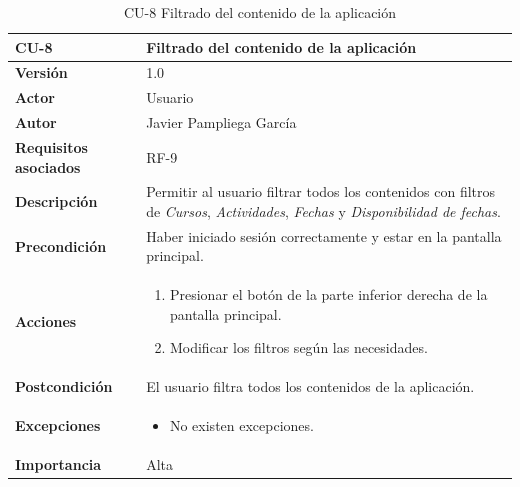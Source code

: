 \begin{table}[p]
	\centering
	\begin{tabularx}{\linewidth}{ p{} p{} }
		\toprule
		\textbf{CU-8}    & \textbf{Filtrado del contenido de la aplicación}\\
		\toprule
		\textbf{Versión}              & 1.0    \\
            \textbf{Actor}                & Usuario \\
		\textbf{Autor}                & Javier Pampliega García \\
		\textbf{Requisitos asociados} & RF-9\\
		\textbf{Descripción}          & Permitir al usuario filtrar todos los contenidos con filtros de \textit{Cursos}, \textit{Actividades}, \textit{Fechas} y \textit{Disponibilidad de fechas}. \\
		\textbf{Precondición}         & Haber iniciado sesión correctamente y estar en la pantalla principal. \\
		\textbf{Acciones}             &
		\begin{enumerate}
			\def\labelenumi{\arabic{enumi}.}
			\tightlist
			\item Presionar el botón de la parte inferior derecha de la pantalla principal.
                \item Modificar los filtros según las necesidades.
		\end{enumerate}\\
		\textbf{Postcondición}        & El usuario filtra todos los contenidos de la aplicación. \\
		\textbf{Excepciones}          & \begin{itemize}
		    \item No existen excepciones.
		\end{itemize} \\
		\textbf{Importancia}          & Alta \\
		\bottomrule
	\end{tabularx}
	\caption{CU-8 Filtrado del contenido de la aplicación}
\end{table}

